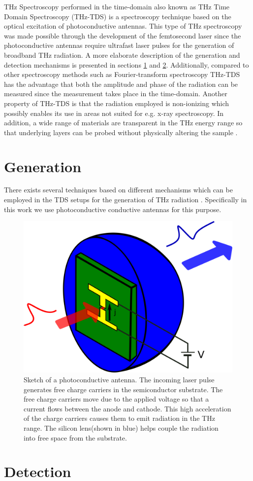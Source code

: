 THz Spectroscopy performed in the time-domain also known as THz Time Domain Spectroscopy (THz-TDS) is a spectroscopy technique based on the optical excitation of photoconductive antennas. This type of THz spectroscopy was made possible through the development of the femtosecond laser since the photoconductive antennas require ultrafast laser pulses for the generation of broadband THz radiation. A more elaborate description of the generation and detection mechanisms is presented in sections \ref{sec:thz-generation} and \ref{sec:thz-detection}. Additionally, compared to other spectroscopy methods such as Fourier-transform spectroscopy THz-TDS has the advantage that both the amplitude and phase of the radiation can be measured since the measurement takes place in the time-domain. Another property of THz-TDS is that the radiation employed is non-ionizing which possibly enables its use in areas not suited for e.g. x-ray spectroscopy. In addition, a wide range of materials are transparent in the THz energy range so that underlying layers can be probed without physically altering the sample \cite{Horlick68, Jepsen2011}.
\section{Generation}
\label{sec:thz-generation}
There exists several techniques based on different mechanisms which can be employed in the TDS setups for the generation of THz radiation \cite{Jepsen2011}. Specifically in this work we use photoconductive conductive antennas for this purpose. 

\begin{figure}[H]
    \centering
    \includegraphics[scale=0.5]{images/2_chapter02/PCA.png}
    \caption{Sketch of a photoconductive antenna. The incoming laser pulse generates free charge carriers in the semiconductor substrate. The free charge carriers move due to the applied voltage so that a current flows between the anode and cathode. This high acceleration of the charge carriers causes them to emit radiation in the THz range. The silicon lens(shown in blue) helps couple the radiation into free space from the substrate.}
    \label{fig:PCA}
\end{figure}

\section{Detection}
\label{sec:thz-detection}
